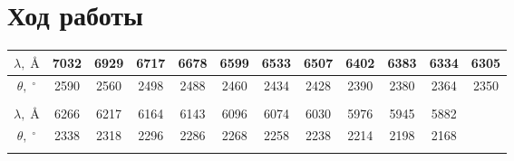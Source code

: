 \section{Ход работы}

\begin{table}[]
\centering
\begin{tabular}{cccccccccccc}
\hline
\multicolumn{1}{|c|}{$\lambda, \;   \text{\AA}$} & \multicolumn{1}{c|}{7032} & \multicolumn{1}{c|}{6929} & \multicolumn{1}{c|}{6717} & \multicolumn{1}{c|}{6678} & \multicolumn{1}{c|}{6599} & \multicolumn{1}{c|}{6533} & \multicolumn{1}{c|}{6507} & \multicolumn{1}{c|}{6402} & \multicolumn{1}{c|}{6383} & \multicolumn{1}{c|}{6334} & \multicolumn{1}{c|}{6305} \\ \hline
\multicolumn{1}{|c|}{$\theta, \; ^\circ$}       & \multicolumn{1}{c|}{2590} & \multicolumn{1}{c|}{2560} & \multicolumn{1}{c|}{2498} & \multicolumn{1}{c|}{2488} & \multicolumn{1}{c|}{2460} & \multicolumn{1}{c|}{2434} & \multicolumn{1}{c|}{2428} & \multicolumn{1}{c|}{2390} & \multicolumn{1}{c|}{2380} & \multicolumn{1}{c|}{2364} & \multicolumn{1}{c|}{2350} \\ \hline
                                                &                           &                           &                           &                           &                           &                           &                           &                           &                           &                           &                           \\ \cline{1-11}
\multicolumn{1}{|c|}{$\lambda, \; \text{\AA}$}   & \multicolumn{1}{c|}{6266} & \multicolumn{1}{c|}{6217} & \multicolumn{1}{c|}{6164} & \multicolumn{1}{c|}{6143} & \multicolumn{1}{c|}{6096} & \multicolumn{1}{c|}{6074} & \multicolumn{1}{c|}{6030} & \multicolumn{1}{c|}{5976} & \multicolumn{1}{c|}{5945} & \multicolumn{1}{c|}{5882} &                           \\ \cline{1-11}
\multicolumn{1}{|c|}{$\theta, \; ^\circ$}       & \multicolumn{1}{c|}{2338} & \multicolumn{1}{c|}{2318} & \multicolumn{1}{c|}{2296} & \multicolumn{1}{c|}{2286} & \multicolumn{1}{c|}{2268} & \multicolumn{1}{c|}{2258} & \multicolumn{1}{c|}{2238} & \multicolumn{1}{c|}{2214} & \multicolumn{1}{c|}{2198} & \multicolumn{1}{c|}{2168} &                           \\ \cline{1-11}
                                                &                           &                           &                           &                           &                           &                           &                           &                           &                           &                           &                           \\ \cline{1-11}

\end{tabular}
\end{table}
